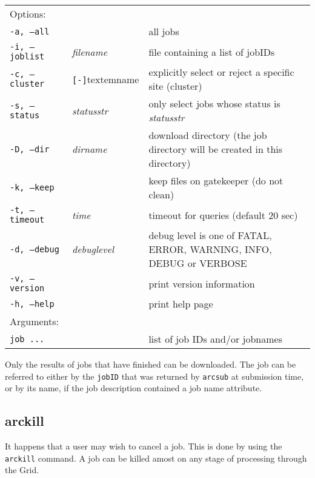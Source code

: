 \hspace*{0.5cm}
\begin{shaded}
\end{shaded}
\begin{longtable}{llp{8cm}}
   Options:&&\\
   \texttt{-a, --all}& & all jobs\\
   \texttt{-i, --joblist}& \textit{filename} & file containing a list of jobIDs\\
   \texttt{-c, --cluster}&\verb#[-]#textem{name}&explicitly select or reject a specific site (cluster)\\
   \texttt{-s, --status}& \textit{statusstr} &only select jobs whose status is \textit{statusstr}\\
   \texttt{-D, --dir} & \textit{dirname} & download directory (the job directory will be created in this directory)\\
   \texttt{-k, --keep}& & keep files on gatekeeper (do not clean)\\
   \texttt{-t, --timeout}& \textit{time} & timeout for queries (default 20 sec)\\
   \texttt{-d, --debug}& \textit{debuglevel}&debug level is one of  FATAL, ERROR, WARNING, INFO, DEBUG or VERBOSE\\
   \texttt{-v, --version}& & print version information\\
   \texttt{-h, --help}& & print help page\\
   Arguments:&&\\
   \texttt{job ...} && list of job IDs and/or jobnames\\
\end{longtable}

Only the results of jobs that have finished can be downloaded. The job
can be referred to either by the \texttt{jobID} that was returned by
\texttt{arcsub} at submission time, or by its name, if the job
description contained a job name attribute.

\subsection{arckill}
\label{sec:arckill}

It happens that a user may wish to cancel a job. This is done by using
the \texttt{arckill}  command. A
job can be killed amost on any stage of processing through the Grid.

